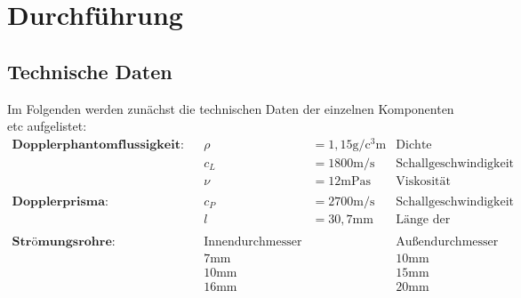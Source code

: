 \section{Durchführung} \label{sec:Durchführung}



\subsection{Technische Daten} \label{sec:Daten}
Im Folgenden werden zunächst die technischen Daten der einzelnen Komponenten etc aufgelistet:
\begin{align*}
    \textbf{Dopplerphantomflussigkeit:} && \rho &= 1,15  \unit\gram / \unit{\cubic\centi\meter} & \text{Dichte} \\
    && c_L &= 1800 \unit\meter / \unit\second & \text{Schallgeschwindigkeit} \\
    && \nu &= 12 \unit{\milli\pascal\second} & \text{Viskosität} \\
    \\
    \textbf{Dopplerprisma:} && c_P &= 2700 \unit\meter / \unit\second & \text{Schallgeschwindigkeit} \\
    && l &= 30,7 \unit{\milli\meter} & \text{Länge der Vorlaufstrecke} \\
    \\
    \textbf{Strömungsrohre:} && \text{Innendurchmesser} && \text{Außendurchmesser} \\
    && 7 \unit{\milli\meter} && 10 \unit{\milli\meter} \\
    && 10 \unit{\milli\meter} && 15 \unit{\milli\meter} \\
    && 16 \unit{\milli\meter} && 20 \unit{\milli\meter} \\
\end{align*}


